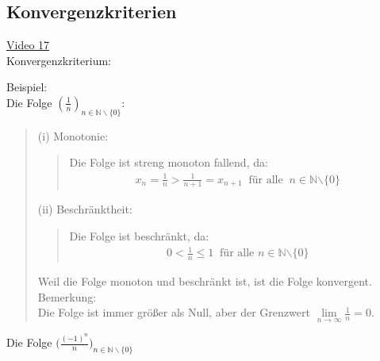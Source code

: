 \subsection{Konvergenzkriterien }
\href{https://youtu.be/KU9z0fJVi-U}{Video 17}\\
Konvergenzkriterium:\\
\begin{center}
	
	
\end{center}
Beispiel:\\
\textbullet \;\; Die Folge $ (\frac{1}{n})_{n\in\mathbb{N}\backslash\{0\}} $:\\
\begin{quote}
	(i) Monotonie:\\
	\begin{quote}
		Die Folge ist streng monoton fallend, da:\\
		\begin{align*}
		x_n=\frac{1}{n}>\frac{1}{n+1}=x_{n+1} \;\;\text{für alle}\;\;n\in\mathbb{N}{\backslash\{0\}}
		\end{align*}
	\end{quote}
	(ii) Beschränktheit:\\
	\begin{quote}
		Die Folge ist beschränkt, da:\\
		\begin{align*}
		0<\frac{1}{n}\leq 1 \;\;\text{für alle }n\in\mathbb{N}{\backslash\{0\}}
		\end{align*}
	\end{quote}
	Weil die Folge monoton und beschränkt ist, ist die Folge konvergent.\\
	Bemerkung:\\
	Die Folge ist immer größer als Null, aber der Grenzwert $ \lim\limits_ {n\to\infty} \frac{1}{n}=0 $.
	
\end{quote}
\textbullet \;\; Die Folge $ \bigg(\frac{(-1)^n}{n}\bigg)_{n\in\mathbb{N}\backslash\{0\}} $\\
